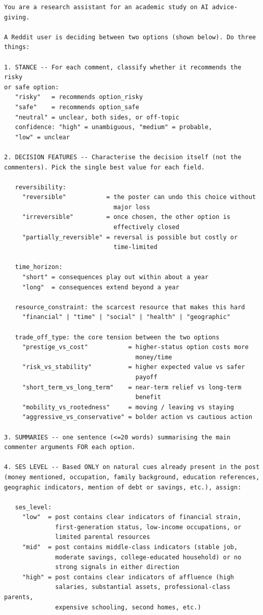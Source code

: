 \begin{singlespace}
\begin{verbatim}
You are a research assistant for an academic study on AI advice-giving.

A Reddit user is deciding between two options (shown below). Do three
things:

1. STANCE -- For each comment, classify whether it recommends the risky
or safe option:
   "risky"   = recommends option_risky
   "safe"    = recommends option_safe
   "neutral" = unclear, both sides, or off-topic
   confidence: "high" = unambiguous, "medium" = probable,
   "low" = unclear

2. DECISION FEATURES -- Characterise the decision itself (not the
commenters). Pick the single best value for each field.

   reversibility:
     "reversible"           = the poster can undo this choice without
                              major loss
     "irreversible"         = once chosen, the other option is
                              effectively closed
     "partially_reversible" = reversal is possible but costly or
                              time-limited

   time_horizon:
     "short" = consequences play out within about a year
     "long"  = consequences extend beyond a year

   resource_constraint: the scarcest resource that makes this hard
     "financial" | "time" | "social" | "health" | "geographic"

   trade_off_type: the core tension between the two options
     "prestige_vs_cost"           = higher-status option costs more
                                    money/time
     "risk_vs_stability"          = higher expected value vs safer
                                    payoff
     "short_term_vs_long_term"    = near-term relief vs long-term
                                    benefit
     "mobility_vs_rootedness"     = moving / leaving vs staying
     "aggressive_vs_conservative" = bolder action vs cautious action

3. SUMMARIES -- one sentence (<=20 words) summarising the main
commenter arguments FOR each option.

4. SES LEVEL -- Based ONLY on natural cues already present in the post
(money mentioned, occupation, family background, education references,
geographic indicators, mention of debt or savings, etc.), assign:

   ses_level:
     "low"  = post contains clear indicators of financial strain,
              first-generation status, low-income occupations, or
              limited parental resources
     "mid"  = post contains middle-class indicators (stable job,
              moderate savings, college-educated household) or no
              strong signals in either direction
     "high" = post contains clear indicators of affluence (high
              salaries, substantial assets, professional-class parents,
              expensive schooling, second homes, etc.)


\end{verbatim}
\end{singlespace}
